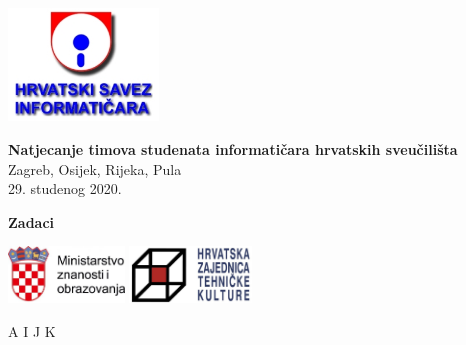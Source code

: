 \documentclass[a4paper]{article}
\begin{document}
\thispagestyle{empty}
\begin{center}
  \includegraphics[height=3cm]{pic/hsin.jpg}
\end{center}
\vspace{1cm}
\begin{center}
  {\Large\textbf{\textsf{Natjecanje timova studenata informatičara hrvatskih sveučilišta}}} \\
  \vspace{.5cm}
  {\large{\textsf{Zagreb, Osijek, Rijeka, Pula}}} \\
  \vspace{.3cm}
  \textsf{29. studenog 2020.}
\end{center}
\vspace{2cm}
\begin{center}
  {\large \textbf{Zadaci}}

  \begin{minipage}{.5\textwidth}
    \renewcommand\contentsname{}
    \tableofcontents
  \end{minipage}
\end{center}
\vspace{5cm}
\begin{center}
  \includegraphics[height=1.5cm]{pic/mzo.jpg}
  \hspace{3cm}
  \includegraphics[height=1.5cm]{pic/hztk.png}
\end{center}
\vspace{\fill}
\clearpage
\setcounter{page}{1}
{A}
{I}
{J}
{K}
\end{document}
